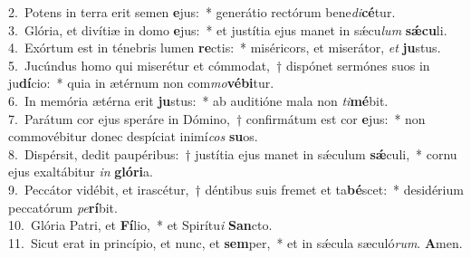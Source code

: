 {2.~}Potens in terra erit semen \textbf{e}jus:~* generátio rectórum bene\textit{di}\textbf{cé}tur.\\
{3.~}Glória, et divítiæ in domo \textbf{e}jus:~* et justítia ejus manet in sǽcu\textit{lum} \textbf{sǽ}\textbf{cu}li.\\
{4.~}Exórtum est in ténebris lumen \textbf{re}ctis:~* miséricors, et miserátor, \textit{et} \textbf{ju}stus.\\
{5.~}Jucúndus homo qui miserétur et cómmodat,~† dispónet sermónes suos in ju\textbf{dí}cio:~* quia in ætérnum non com\textit{mo}\textbf{vé}\textbf{bi}tur.\\
{6.~}In memória ætérna erit \textbf{ju}stus:~* ab auditióne mala non \textit{ti}\textbf{mé}bit.\\
{7.~}Parátum cor ejus speráre in Dómino,~† confirmátum est cor \textbf{e}jus:~* non commovébitur donec despíciat inimí\textit{cos} \textbf{su}os.\\
{8.~}Dispérsit, dedit paupéribus:~† justítia ejus manet in sǽculum \textbf{sǽ}culi,~* cornu ejus exaltábitur \textit{in} \textbf{gló}\textbf{ri}a.\\
{9.~}Peccátor vidébit, et irascétur,~† déntibus suis fremet et ta\textbf{bé}scet:~* desidérium peccatórum \textit{pe}\textbf{rí}bit.\\
{10.~}Glória Patri, et \textbf{Fí}lio,~* et Spirítu\textit{i} \textbf{San}cto.\\
{11.~}Sicut erat in princípio, et nunc, et \textbf{sem}per,~* et in sǽcula sæculó\textit{rum}. \textbf{A}men.\\
